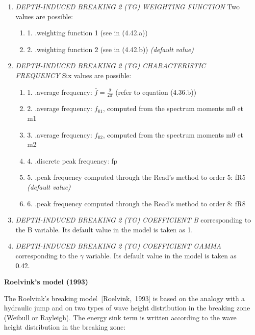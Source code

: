  \begin{enumerate}
\item \textit{DEPTH-INDUCED BREAKING 2 (TG) WEIGHTING FUNCTION} Two values are possible:
 \begin{enumerate}
\
 \item 1. .weighting function 1 (see in (4.42.a))

 \item 2. .weighting function 2 (see in (4.42.b))\textit{ (default value)}
\end{enumerate}

 \item \textit{DEPTH-INDUCED BREAKING 2 (TG) CHARACTERISTIC FREQUENCY} Six values are possible:
 \begin{enumerate}

 \item 1. .average frequency: $\bar{f}=\frac{\bar{\sigma }}{2\pi } $  (refer to equation (4.36.b))

 \item 2. .average frequency: $f_{01} $, computed from the spectrum moments m0 et m1

 \item 3. .average frequency: $f_{02} $, computed from the spectrum moments m0 et m2

 \item 4. .discrete peak frequency: fp

 \item 5. .peak frequency computed through the Read's method to order 5: fR5 \textit{(default value)}

 \item 6. .peak frequency computed through the Read's method to order 8: fR8
\end{enumerate}

 \item \textit{ DEPTH-INDUCED BREAKING 2 (TG) COEFFICIENT B} corresponding to the B variable. Its default value in the model is taken as 1.

 \item \textit{DEPTH-INDUCED BREAKING 2 (TG) COEFFICIENT GAMMA} corresponding to the $\gamma $ variable. Its default value in the model is taken as 0.42.
\end{enumerate}


{\bf  Roelvink's model (1993)}

 The Roelvink's breaking model~[Roelvink,~1993] is based on the analogy with a hydraulic jump and on two types of wave height distribution in the breaking zone (Weibull or Rayleigh). The energy sink term is written according to the wave height distribution in the breaking zone:

